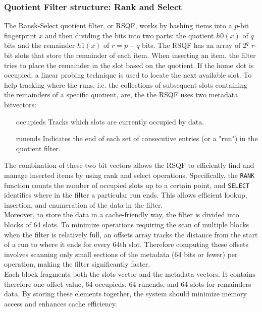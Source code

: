 \subsubsection{Quotient Filter structure: Rank and Select}
The Ransk-Select quotient filter, or RSQF, works by hashing items into a $p$-bit fingerprint $x$ and then dividing the bits into two parts: the quotient $h0(x)$ of $q$ bits and the remainder $h1(x)$ of $r = p - q$ bits. The RSQF has an array of $2^q$ $r$-bit slots that store the remainder of each item. When inserting an item, the filter tries to place the remainder in the slot based on the quotient. If the home slot is occupied, a linear probing technique is used to locate the next available slot.
To help tracking where the runs, i.e. the collections of subsequent slots containing the remainders of a specific quotient, are, the the RSQF uses two metadata bitvectors:
\begin{itemize}
	\item[occupieds] Tracks which slots are currently occupied by data.
	\item[runends] Indicates the end of each set of consecutive entries (or a "run") in the quotient filter.
\end{itemize}
The combination of these two bit vectors allows the RSQF to efficiently find and manage inserted items by using rank and select operations. Specifically, the \texttt{RANK} function counts the number of occupied slots up to a certain point, and  \texttt{SELECT} identifies where in the filter a particular run ends. This allows efficient lookup, insertion, and enumeration of the data in the filter.\\
Moreover, to store the data in a cache-friendly way, the filter is divided into blocks of 64 slots. To minimize operations requiring the scan of multiple blocks when the filter is relatively full, an offsets array tracks the distance from the start of a run to where it ends for every 64th slot. Therefore computing these offsets involves scanning only small sections of the metadata (64 bits or fewer) per operation, making the filter significantly faster.\\
Each block fragments both the slots vector and the metadata vectors. It contains therefore one offset value, 64 occupieds, 64 runends, and 64 slots for remainders data. By storing these elements together, the system should minimize memory access and enhances cache efficiency. 
